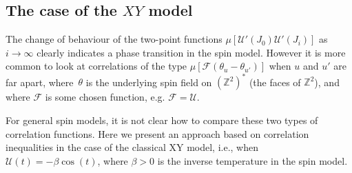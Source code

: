 \documentclass[11pt, reqno]{amsart}
\numberwithin{equation}{section}
\theoremstyle{definition}
\theoremstyle{remark}
\begin{document}
\subsection{The case of the $XY$ model}
The change of behaviour of the two-point functions $\mu[\mathcal U'(J_0) \mathcal U'(J_i)]$ as $i\to \infty$ clearly indicates a phase transition in the spin model. However it is more common to look at correlations of the type $\mu[\mathcal F(\theta_u-\theta_{u'})]$ when $u$ and $u'$ are far apart, where~$\theta$ is the underlying spin field on $(\mathbb Z^2)^*$ (the faces of $\mathbb Z^2$), and where $\mathcal F$ is some chosen function, e.g. $\mathcal F=\mathcal U$. 

For general spin models, it is not clear how to compare these two types of correlation functions. Here we present an approach based on correlation inequalities in the case of the classical XY model, i.e., when $\mathcal U(t)=- \beta\cos(t)$, where $\beta>0$ is the inverse temperature in the spin model.
\end{document}

